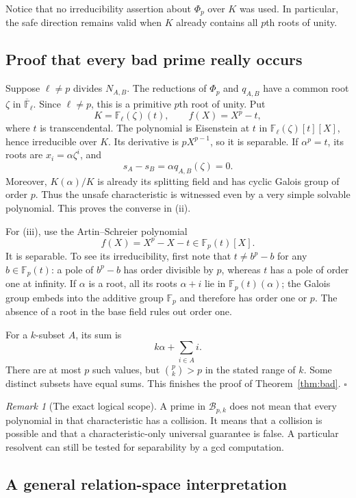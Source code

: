 \documentclass[11pt,a4paper]{article}
\theoremstyle{definition}
\theoremstyle{remark}
\newtheorem{remark}[theorem]{Remark}
\newcommand{\F}{\mathbb F}
\begin{document}
Notice that no irreducibility assertion about $\Phi_p$ over $K$ was used.
In particular, the safe direction remains valid when $K$ already contains
all $p$th roots of unity.

\subsection{Proof that every bad prime really occurs}

Suppose $\ell\neq p$ divides $N_{A,B}$. The reductions of $\Phi_p$ and
$q_{A,B}$ have a common root $\zeta$ in $\overline{\F}_\ell$. Since
$\ell\neq p$, this is a primitive $p$th root of unity. Put
\[
 K=\F_\ell(\zeta)(t),\qquad f(X)=X^p-t,
\]
where $t$ is transcendental. The polynomial is Eisenstein at $t$ in
$\F_\ell(\zeta)[t][X]$, hence irreducible over $K$. Its derivative is
$pX^{p-1}$, so it is separable. If $\alpha^p=t$, its roots are
$x_i=\alpha\zeta^i$, and
\[
 s_A-s_B=\alpha q_{A,B}(\zeta)=0.
\]
Moreover, $K(\alpha)/K$ is already its splitting field and has cyclic
Galois group of order $p$. Thus the unsafe characteristic is witnessed even
by a very simple solvable polynomial. This proves the converse in (ii).

For (iii), use the Artin--Schreier polynomial
\[
 f(X)=X^p-X-t\in\F_p(t)[X].
\]
It is separable. To see its irreducibility, first note that
$t\neq b^p-b$ for any $b\in\F_p(t)$: a pole of $b^p-b$ has order divisible
by $p$, whereas $t$ has a pole of order one at infinity. If $\alpha$ is a
root, all its roots $\alpha+i$ lie in $\F_p(t)(\alpha)$; the Galois group
embeds into the additive group $\F_p$ and therefore has order one or $p$.
The absence of a root in the base field rules out order one.

For a $k$-subset $A$, its sum is
\[
 k\alpha+\sum_{i\in A}i.
\]
There are at most $p$ such values, but $\binom pk>p$ in the stated range of
$k$. Some distinct subsets have equal sums. This finishes the proof of
Theorem~\ref{thm:bad}. \hfill$\square$

\begin{remark}[The exact logical scope]
A prime in $\mathcal B_{p,k}$ does not mean that every polynomial in that
characteristic has a collision. It means that a collision is possible and
that a characteristic-only universal guarantee is false. A particular
resolvent can still be tested for separability by a gcd computation.
\end{remark}

\subsection{A general relation-space interpretation}
\end{document}
